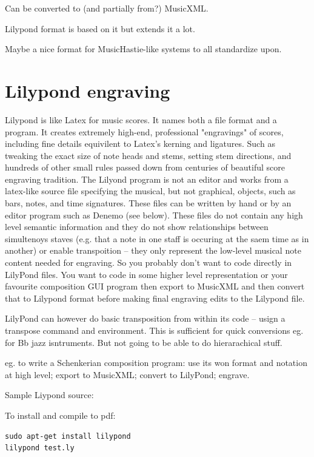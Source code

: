\documentclass[oneside,english]{scrbook}
\begin{document}
Can be converted to (and partially from?) MusicXML.

Lilypond format is based on it but extends it a lot.

Maybe a nice format for MusicHastie-like systems to all standardize upon.


\section{Lilypond engraving}

Lilypond is like Latex for music scores.  It names both a file format and a program.  It creates extremely high-end, professional "engravings" of scores, including fine details equivilent to Latex's kerning and ligatures. Such as tweaking the exact size of note heads and stems, setting stem directions, and hundreds of other small rules passed down from centuries of beautiful score engraving tradition.   The Lilyond program is not an editor and works from a latex-like source file specifying the musical, but not graphical, objects, such as bars, notes, and time signatures. These files can be written by hand or by an editor program such as Denemo (see below). These files do not contain any high level semantic information and they do not show relationships between simultenoys staves (e.g. that a note in one staff is occuring at the saem time as in another) or enable transpoition -- they only represent the low-level musical note content needed for engraving. So you probably don't want to code directly in LilyPond files. You want to code in some higher level representation or your favourite composition GUI program then export to MusicXML and then convert that to Lilypond format before making final engraving edits to the Lilypond file.  

LilyPond can however do basic transposition from within its code -- usign a transpose command and environment. This is sufficient for quick conversions eg. for Bb jazz isntruments. But not going to be able to do hierarachical stuff.

eg. to write a Schenkerian composition program: use its won format and notation at high level; export to MusicXML; convert to LilyPond; engrave.

Sample Liypond source:


To install and compile to pdf:

\begin{lstlisting}
sudo apt-get install lilypond
lilypond test.ly
\end{lstlisting}
\end{document}
